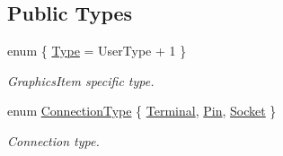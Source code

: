 \subsection*{Public Types}
\begin{DoxyCompactItemize}
\item 
enum \{ \hyperlink{classmdt_cl_path_graphics_connection_adb7a7919297de79c33962e62655af050a9843d7f20edcdad949a8e3611ca47625}{Type} = User\-Type + 1
 \}
\begin{DoxyCompactList}\small\item\em Graphics\-Item specific type. \end{DoxyCompactList}\item 
enum \hyperlink{classmdt_cl_path_graphics_connection_af26f48d07af6395c5395d8078facb3a5}{Connection\-Type} \{ \hyperlink{classmdt_cl_path_graphics_connection_af26f48d07af6395c5395d8078facb3a5a3bd7f2546e9b1653f6e9b9ad3e079a6e}{Terminal}, 
\hyperlink{classmdt_cl_path_graphics_connection_af26f48d07af6395c5395d8078facb3a5a5e0126284fe1a9941c5a8dec39337ccf}{Pin}, 
\hyperlink{classmdt_cl_path_graphics_connection_af26f48d07af6395c5395d8078facb3a5adbf5ae12dbb4429f895c6a6bdb52c6bf}{Socket}
 \}
\begin{DoxyCompactList}\small\item\em Connection type. \end{DoxyCompactList}\end{DoxyCompactItemize}
